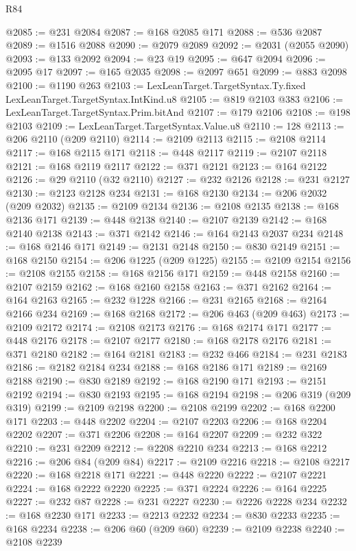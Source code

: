 \begin{lexlean}{R84}
\begin{coremodule}
@2085 := @231 @2084
@2087 := @168 @2085 @171
@2088 := @536 @2087
@2089 := @1516 @2088
@2090 := @2079 @2089
@2092 := @2031 (@2055 @2090)
@2093 := @133 @2092
@2094 := @23 @19
@2095 := @647 @2094
@2096 := @2095 @17
@2097 := @165 @2035
@2098 := @2097 @651
@2099 := @883 @2098
@2100 := @1190 @263
@2103 := LexLeanTarget.TargetSyntax.Ty.fixed LexLeanTarget.TargetSyntax.IntKind.u8
@2105 := @819 @2103 @383
@2106 := LexLeanTarget.TargetSyntax.Prim.bitAnd
@2107 := @179 @2106
@2108 := @198 @2103
@2109 := LexLeanTarget.TargetSyntax.Value.u8
@2110 := 128
@2113 := @206 @2110 (@209 @2110)
@2114 := @2109 @2113
@2115 := @2108 @2114
@2117 := @168 @2115 @171
@2118 := @448 @2117
@2119 := @2107 @2118
@2121 := @168 @2119 @2117
@2122 := @371 @2121
@2123 := @164 @2122
@2126 := @29 @2110 (@32 @2110)
@2127 := @232 @2126
@2128 := @231 @2127
@2130 := @2123 @2128 @234
@2131 := @168 @2130
@2134 := @206 @2032 (@209 @2032)
@2135 := @2109 @2134
@2136 := @2108 @2135
@2138 := @168 @2136 @171
@2139 := @448 @2138
@2140 := @2107 @2139
@2142 := @168 @2140 @2138
@2143 := @371 @2142
@2146 := @164 @2143 @2037 @234
@2148 := @168 @2146 @171
@2149 := @2131 @2148
@2150 := @830 @2149
@2151 := @168 @2150
@2154 := @206 @1225 (@209 @1225)
@2155 := @2109 @2154
@2156 := @2108 @2155
@2158 := @168 @2156 @171
@2159 := @448 @2158
@2160 := @2107 @2159
@2162 := @168 @2160 @2158
@2163 := @371 @2162
@2164 := @164 @2163
@2165 := @232 @1228
@2166 := @231 @2165
@2168 := @2164 @2166 @234
@2169 := @168 @2168
@2172 := @206 @463 (@209 @463)
@2173 := @2109 @2172
@2174 := @2108 @2173
@2176 := @168 @2174 @171
@2177 := @448 @2176
@2178 := @2107 @2177
@2180 := @168 @2178 @2176
@2181 := @371 @2180
@2182 := @164 @2181
@2183 := @232 @466
@2184 := @231 @2183
@2186 := @2182 @2184 @234
@2188 := @168 @2186 @171
@2189 := @2169 @2188
@2190 := @830 @2189
@2192 := @168 @2190 @171
@2193 := @2151 @2192
@2194 := @830 @2193
@2195 := @168 @2194
@2198 := @206 @319 (@209 @319)
@2199 := @2109 @2198
@2200 := @2108 @2199
@2202 := @168 @2200 @171
@2203 := @448 @2202
@2204 := @2107 @2203
@2206 := @168 @2204 @2202
@2207 := @371 @2206
@2208 := @164 @2207
@2209 := @232 @322
@2210 := @231 @2209
@2212 := @2208 @2210 @234
@2213 := @168 @2212
@2216 := @206 @84 (@209 @84)
@2217 := @2109 @2216
@2218 := @2108 @2217
@2220 := @168 @2218 @171
@2221 := @448 @2220
@2222 := @2107 @2221
@2224 := @168 @2222 @2220
@2225 := @371 @2224
@2226 := @164 @2225
@2227 := @232 @87
@2228 := @231 @2227
@2230 := @2226 @2228 @234
@2232 := @168 @2230 @171
@2233 := @2213 @2232
@2234 := @830 @2233
@2235 := @168 @2234
@2238 := @206 @60 (@209 @60)
@2239 := @2109 @2238
@2240 := @2108 @2239

\end{coremodule}
\end{lexlean}

